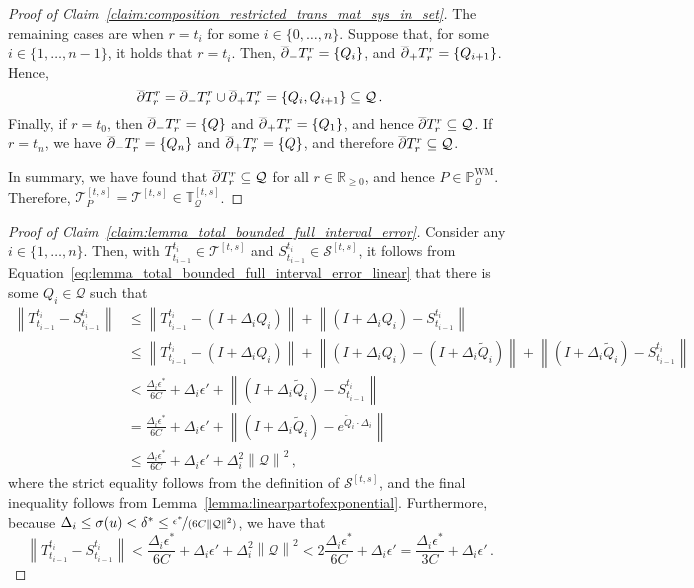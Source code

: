 \documentclass[10pt]{paper}
\theoremstyle{definition}
\newcommand{\reals}{\mathbb{R}}
\newcommand{\realsnonneg}{\reals_{\geq 0}}
\newcommand{\processes}{\mathbb{P}}
\newcommand{\wmprocesses}{\processes^{\mathrm{WM}}}
\newcommand{\rateset}{\mathcal{Q}}
\newcommand{\norm}[1]{\left\lVert #1 \right\rVert}
\begin{document}
\begin{proof}[Proof of Claim~\ref{claim:composition_restricted_trans_mat_sys_in_set}]
The remaining cases are when $r=t_i$ for some $i\in\{0,\ldots,n\}$. Suppose that, for some $i\in\{1,\ldots,n-1\}$, it holds that $r=t_i$. Then, $\smash{\overline{\partial}}_-T_r^r=\{Q_{i}\}$, and $\smash{\overline{\partial}}_+T_r^r=\{Q_{i+1}\}$. Hence,
\begin{equation*}
\smash{\overline{\partial}}T_r^r = \smash{\overline{\partial}}_-T_r^r\cup\smash{\overline{\partial}}_+T_r^r=\{Q_{i},Q_{i+1}\}\subseteq\rateset\,.
\end{equation*}
Finally, if $r=t_0$, then $\smash{\overline{\partial}}_-T_r^r=\{Q\}$ and $\smash{\overline{\partial}}_+T_r^r=\{Q_1\}$, and hence $\smash{\overline{\partial}}T_r^r\subseteq\rateset$. If $r=t_n$, we have $\smash{\overline{\partial}}_-T_r^r=\{Q_n\}$ and $\smash{\overline{\partial}}_+T_r^r=\{Q\}$, and therefore $\smash{\overline{\partial}}T_r^r\subseteq\rateset$.

In summary, we have found that $\smash{\overline{\partial}}T_r^r\subseteq\rateset$ for all $r\in\realsnonneg$, and hence $P\in\wmprocesses_\rateset$. Therefore, $\mathcal{T}_P^{[t,s]}=\mathcal{T}^{[t,s]}\in\mathbb{T}_\rateset^{[t,s]}$.
\end{proof}

\begin{proof}[Proof of Claim~\ref{claim:lemma_total_bounded_full_interval_error}]
Consider any $i\in\{1,\ldots,n\}$. Then, with $T_{t_{i-1}}^{t_i}\in\mathcal{T}^{[t,s]}$ and $S_{t_{i-1}}^{t_i}\in\mathcal{S}^{[t,s]}$, it follows from Equation~\eqref{eq:lemma_total_bounded_full_interval_error_linear} that there is some $Q_i\in\rateset$ such that
\begin{align*}
\norm{T_{t_{i-1}}^{t_i} - S_{t_{i-1}}^{t_i}} &\leq \norm{T_{t_{i-1}}^{t_i} - (I+\Delta_iQ_i)} + \norm{(I+\Delta_iQ_i) - S_{t_{i-1}}^{t_i}} \\
 &\leq \norm{T_{t_{i-1}}^{t_i} - (I+\Delta_iQ_i)} + \norm{(I+\Delta_iQ_i) - (I+\Delta_i\widetilde{Q}_i)} + \norm{(I+\Delta_i\widetilde{Q}_i) - S_{t_{i-1}}^{t_i}} \\
 &< \frac{\Delta_i\epsilon^*}{6C} + \Delta_i\epsilon' + \norm{(I+\Delta_i\widetilde{Q}_i) - S_{t_{i-1}}^{t_i}} \\
 &= \frac{\Delta_i\epsilon^*}{6C} + \Delta_i\epsilon' + \norm{(I+\Delta_i\widetilde{Q}_i) - e^{\widetilde{Q}_i\cdot\Delta_i}} \\
 &\leq \frac{\Delta_i\epsilon^*}{6C} + \Delta_i\epsilon' + \Delta_i^2\norm{\rateset}^2\,,
\end{align*}
where the strict equality follows from the definition of $\mathcal{S}^{[t,s]}$, and the final inequality follows from Lemma~\ref{lemma:linearpartofexponential}. Furthermore, because $\Delta_i\leq\sigma(u)<\delta^*\leq\nicefrac{\epsilon^*}{(6C\norm{\rateset}^2)}$, we have that
\begin{equation*}
\norm{T_{t_{i-1}}^{t_i} - S_{t_{i-1}}^{t_i}} < \frac{\Delta_i\epsilon^*}{6C} + \Delta_i\epsilon' + \Delta_i^2\norm{\rateset}^2 < 2\frac{\Delta_i\epsilon^*}{6C} + \Delta_i\epsilon' = \frac{\Delta_i\epsilon^*}{3C} + \Delta_i\epsilon'\,.
\end{equation*}
\end{proof}
\end{document}
